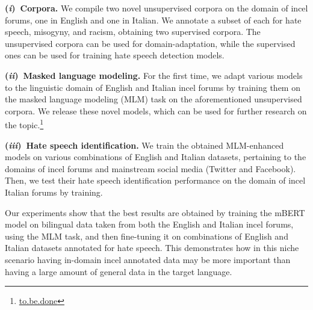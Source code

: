 \documentclass[11pt]{article}
\newcommand{\Ni}{({\em i})~}
\newcommand{\Nii}{({\em ii})~}
\newcommand{\Niii}{({\em iii})~}
\newcommand{\enforum}{\textit{Incels.is}}
\newcommand{\itforum}{\textit{Il forum dei brutti}}
\begin{document}
\noindent
\textbf{\Ni Corpora.} We compile two novel unsupervised corpora on the domain of incel forums, one in English and one in Italian. We annotate a subset of each for hate speech, misogyny, and racism, obtaining two supervised corpora. The unsupervised corpora can be used for domain-adaptation, while the supervised ones can be used for training hate speech detection models.

\textbf{\Nii Masked language modeling.} For the first time, we adapt various models to the linguistic domain of English and Italian incel forums by training them on the masked language modeling (MLM) task on the aforementioned unsupervised corpora. We release these novel models, which can be used for further research on the topic.\footnote{\url{to.be.done}}

\textbf{\Niii Hate speech identification.} We train the obtained MLM-enhanced models on various combinations of English and Italian datasets, pertaining to the domains of incel forums and mainstream social media (Twitter and Facebook). Then, we test their hate speech identification performance on the domain of incel Italian forums by training.



Our experiments show that the best results are obtained by training the mBERT model on bilingual data taken from both the English and Italian incel forums, using the MLM task, and then fine-tuning it on combinations of English and Italian datasets annotated for hate speech. This demonstrates how in this niche scenario having in-domain incel annotated data may be more important than having a large amount of general data in the target language.
\end{document}
